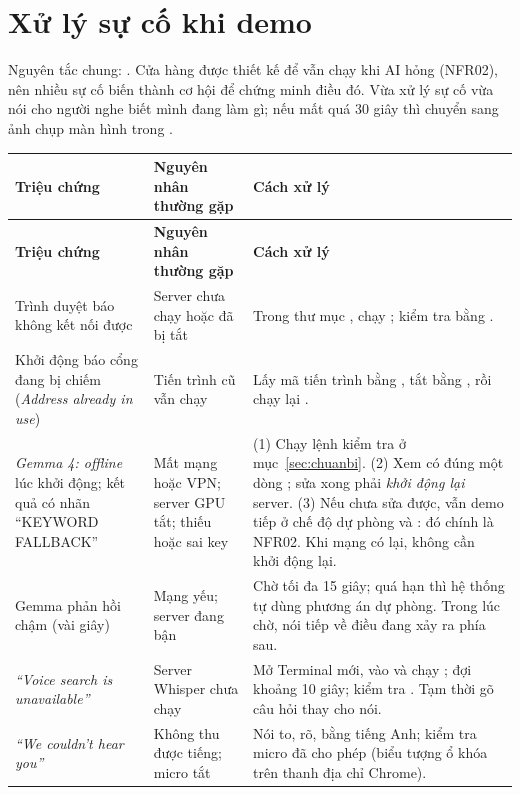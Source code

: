 \section{Xử lý sự cố khi demo}\label{sec:suco}
Nguyên tắc chung: . Cửa hàng được thiết kế để vẫn chạy khi AI hỏng (NFR02), nên nhiều sự cố biến thành cơ hội để chứng minh điều đó.
Vừa xử lý sự cố vừa nói cho người nghe biết mình đang làm gì; nếu mất quá 30 giây thì chuyển sang ảnh chụp màn hình trong .

\begin{longtable}{@{}P{3.3cm}P{3.9cm}P{8.6cm}@{}}
\toprule
\textbf{Triệu chứng} & \textbf{Nguyên nhân thường gặp} & \textbf{Cách xử lý}\\
\midrule\endfirsthead
\toprule
\textbf{Triệu chứng} & \textbf{Nguyên nhân thường gặp} & \textbf{Cách xử lý}\\
\midrule\endhead
Trình duyệt báo không kết nối được  & Server chưa chạy hoặc đã bị tắt & Trong thư mục , chạy ; kiểm tra bằng .\\
\addlinespace
Khởi động báo cổng đang bị chiếm (\emph{Address already in use}) & Tiến trình cũ vẫn chạy & Lấy mã tiến trình bằng , tắt bằng , rồi chạy lại .\\
\addlinespace
\emph{Gemma 4: offline} lúc khởi động; kết quả có nhãn ``KEYWORD FALLBACK'' & Mất mạng hoặc VPN; server GPU tắt; thiếu hoặc sai key & (1) Chạy lệnh kiểm tra ở mục~\ref{sec:chuanbi}. (2) Xem  có đúng một dòng ; sửa xong phải \emph{khởi động lại} server. (3) Nếu chưa sửa được, vẫn demo tiếp ở chế độ dự phòng và : đó chính là NFR02. Khi mạng có lại, không cần khởi động lại.\\
\addlinespace
Gemma phản hồi chậm (vài giây) & Mạng yếu; server đang bận & Chờ tối đa 15 giây; quá hạn thì hệ thống tự dùng phương án dự phòng. Trong lúc chờ, nói tiếp về điều đang xảy ra phía sau.\\
\addlinespace
\emph{``Voice search is unavailable''} & Server Whisper chưa chạy & Mở Terminal mới, vào  và chạy ; đợi khoảng 10 giây; kiểm tra . Tạm thời gõ câu hỏi thay cho nói.\\
\addlinespace
\emph{``We couldn't hear you''} & Không thu được tiếng; micro tắt & Nói to, rõ, bằng tiếng Anh; kiểm tra micro đã cho phép (biểu tượng ổ khóa trên thanh địa chỉ Chrome).\\

\end{longtable}
